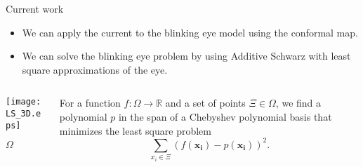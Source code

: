 \documentclass{beamer}
\newcommand{\R}{\mathbb{R}}
\newcommand{\vect}[1]{\mathbf{#1}}
\begin{document}
\begin{frame}{Current work}
\begin{itemize}
\item We can apply the current to the blinking eye model using the conformal map.
\item We can solve the blinking eye problem by using Additive Schwarz with least square approximations of the eye.
\end{itemize}

\begin{columns}[c]

\begin{column}{0.5\textwidth}	
\begin{center}
\texttt{[image: LS\_3D.eps]}	

$\Omega$

\end{center}
\end{column}

\begin{column}{0.5\textwidth}
For a function $f:\Omega \to \R$ and a set of points $\Xi \in \Omega$, we find a polynomial $p$ in the span of a Chebyshev polynomial basis that minimizes the least square problem $$ \sum_{x_i \in \Xi} (f(\vect{x_i})-p(\vect{x_i}))^2. $$
\end{column}
\end{columns}
\end{frame}
\end{document}
